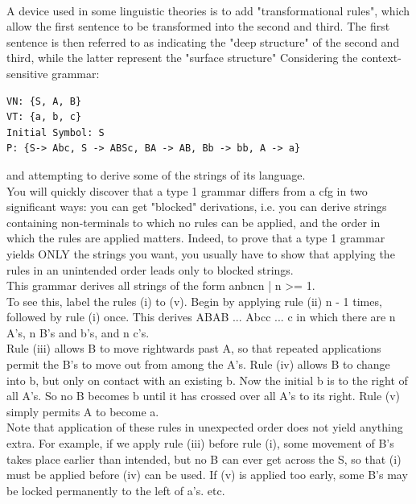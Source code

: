 \documentclass[12pt]{article}
\begin{document}
\\
A device used in some linguistic theories is to add "transformational rules", which allow the first sentence to be transformed into the second and third. The first sentence is then referred to as indicating the "deep structure" of the second and third, while the latter represent the "surface structure"
\newpage
Considering the context-sensitive grammar:
\begin{verbatim}
VN: {S, A, B}
VT: {a, b, c}
Initial Symbol: S
P: {S-> Abc, S -> ABSc, BA -> AB, Bb -> bb, A -> a}
\end{verbatim}
and attempting to derive some of the strings of its language.
\\
You will quickly discover that a type 1 grammar differs from a cfg in two significant ways: you can get "blocked" derivations, i.e. you can derive strings containing non-terminals to which no rules can be applied, and the order in which the rules are applied matters. Indeed, to prove that a type 1 grammar yields ONLY the strings you want, you usually have to show that applying the rules in an unintended order leads only to blocked strings.
\\
This grammar derives all strings of the form {anbncn | n \textgreater= 1}.
\\
To see this, label the rules (i) to (v). Begin by applying rule (ii) n - 1 times, followed by rule (i) once. This derives ABAB ... Abcc ... c in which there are n A's, n B's and b's, and n c's.
\\
Rule (iii) allows B to move rightwards past A, so that repeated applications permit the B's to move out from among the A's. Rule (iv) allows B to change into b, but only on contact with an existing b. Now the initial b is to the right of all A's. So no B becomes b until it has crossed over all A's to its right. Rule (v) simply permits A to become a.
\\
Note that application of these rules in unexpected order does not yield anything extra. For example, if we apply rule (iii) before rule (i), some movement of B's takes place earlier than intended, but no B can ever get across the S, so that (i) must be applied before (iv) can be used. If (v) is applied too early, some B's may be locked permanently to the left of a's. etc.
\end{document}
